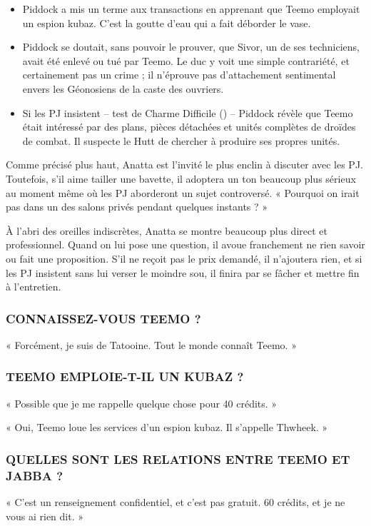 \documentclass[a4paper,10pt,twoside,twocolumn,openany]{book}
\begin{document}
\begin{itemize}
\item Piddock a mis un terme aux transactions en apprenant que Teemo employait un espion kubaz. C’est la goutte d’eau qui a fait déborder le vase.
\item Piddock se doutait, sans pouvoir le prouver, que Sivor, un de ses techniciens, avait été enlevé ou tué par Teemo. Le duc y voit une simple contrariété, et certainement pas un crime ; il n’éprouve pas d’attachement sentimental envers les Géonosiens de la caste des ouvriers.
\item Si les PJ insistent – test de Charme Difficile (\difficulty \difficulty \difficulty) – Piddock révèle que Teemo était intéressé par des plans, pièces détachées et unités complètes de droïdes de combat. Il suspecte le Hutt de chercher à produire ses propres unités.
\end{itemize}

\subtitle{L’INFORMATEUR}

Comme précisé plus haut, Anatta est l’invité le plus enclin à discuter avec les PJ. Toutefois, s’il aime tailler une
bavette, il adoptera un ton beaucoup plus sérieux au moment même où les PJ aborderont un sujet controversé.
« Pourquoi on irait pas dans un des salons privés pendant
quelques instants ? »

À l’abri des oreilles indiscrètes, Anatta se montre
beaucoup plus direct et professionnel. Quand on lui
pose une question, il avoue franchement ne rien savoir
ou fait une proposition. S’il ne reçoit pas le prix demandé, il n’ajoutera rien, et si les PJ insistent sans lui
verser le moindre sou, il finira par se fâcher et mettre
fin à l’entretien.

\subsubsection{CONNAISSEZ-VOUS TEEMO ?}
« Forcément, je suis de Tatooine. Tout le monde connaît
Teemo. »

\subsubsection{TEEMO EMPLOIE-T-IL UN KUBAZ ?}

« Possible que je me rappelle quelque chose pour 40
crédits. »

« Oui, Teemo loue les services d’un espion kubaz. Il
s’appelle Thwheek. »

\subsubsection{QUELLES SONT LES RELATIONS ENTRE TEEMO
ET JABBA ?}
« C’est un renseignement confidentiel, et c’est pas gratuit. 60 crédits, et je ne vous ai rien dit. »
\end{document}
